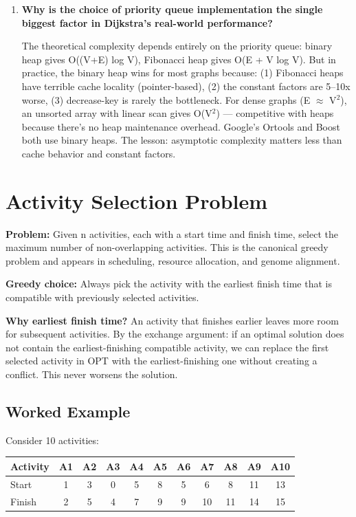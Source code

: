 \begin{enumerate}
\item \textbf{Why is the choice of priority queue implementation the single biggest factor in Dijkstra's real-world performance?}\label{faq:dijkstra-pq}

The theoretical complexity depends entirely on the priority queue: binary heap gives O((V+E) log V), Fibonacci heap gives O(E + V log V). But in practice, the binary heap wins for most graphs because: (1) Fibonacci heaps have terrible cache locality (pointer-based), (2) the constant factors are 5--10x worse, (3) decrease-key is rarely the bottleneck. For dense graphs (E $\approx$ V$^{2}$), an unsorted array with linear scan gives O(V$^{2}$) — competitive with heaps because there's no heap maintenance overhead. Google's Ortools and Boost both use binary heaps. The lesson: asymptotic complexity matters less than cache behavior and constant factors.
\end{enumerate}

\section{Activity Selection Problem}

\textbf{Problem:} Given n activities, each with a start time and finish time, select the maximum number of non-overlapping activities. This is the canonical greedy problem and appears in scheduling, resource allocation, and genome alignment.

\textbf{Greedy choice:} Always pick the activity with the earliest finish time that is compatible with previously selected activities.

\textbf{Why earliest finish time?} An activity that finishes earlier leaves more room for subsequent activities. By the exchange argument: if an optimal solution does not contain the earliest-finishing compatible activity, we can replace the first selected activity in OPT with the earliest-finishing one without creating a conflict. This never worsens the solution.

\subsection{Worked Example}

Consider 10 activities:

\begin{center}
\begin{tabular}{lcccccccccc}
\toprule
Activity & A1 & A2 & A3 & A4 & A5 & A6 & A7 & A8 & A9 & A10 \\
\midrule
Start    & 1  & 3  & 0  & 5  & 8  & 5  & 6  & 8  & 11 & 13 \\
Finish   & 2  & 5  & 4  & 7  & 9  & 9  & 10 & 11 & 14 & 15 \\
\bottomrule
\end{tabular}
\end{center}

